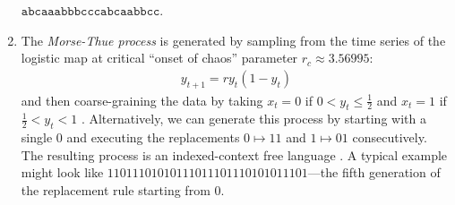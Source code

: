 \documentclass[draft,aps,pre,twocolumn,groupaddress,showkeys,nofootinbib,preprintnumbers,floatfix]{revtex4-2}
\begin{document}
\begin{enumerate}
	$\mathtt{abcaaabbbcccabcaabbcc}$.
\item The \emph{Morse-Thue process} is generated by sampling from the time
	series of the logistic map at critical ``onset of chaos'' parameter
	$r_c \approx 3.56995$:
\begin{align*}
    y_{t+1} = r y_t(1-y_t)
\end{align*}
	and then coarse-graining the data by taking $x_t = 0$ if $0< y_t \leq
	\frac{1}{2}$ and $x_t = 1$ if $\frac{1}{2} < y_t <1$ \cite{Kurk03a}.
	Alternatively, we can generate this process by starting with a single $0$
	and executing the replacements $0 \mapsto 11$ and $1 \mapsto 01$
	consecutively. The resulting process is an indexed-context free language
	\cite{Crut92c}. A typical example might look like
	$11011101010111011101110101011101$---the fifth generation of the
	replacement rule starting from $0$.
\end{enumerate}
\end{document}
